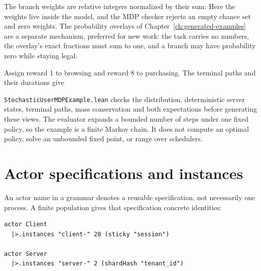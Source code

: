 The branch weights are relative integers normalized by their sum:
Here the weights live inside the model, and the MDP checker rejects an empty
chance set and zero weights. The probability overlays of
Chapter~\ref{ch:generated-examples} are a separate mechanism, preferred for new
work: the task carries no numbers, the overlay's exact fractions must sum to one,
and a branch may have probability zero while staying legal.

Assign reward 1 to browsing and reward 8 to purchasing. The terminal paths and
their durations give
\begin{center}
\end{center}

\texttt{StochasticUserMDPExample.lean} checks the distribution, deterministic
server states, terminal paths, mass conservation and both expectations before
generating these views. The evaluator expands a bounded number of steps under one
fixed policy, so the example is a finite Markov chain. It does not compute an
optimal policy, solve an unbounded fixed point, or range over schedulers.

\section{Actor specifications and instances}

An actor name in a grammar denotes a reusable specification, not necessarily one
process. A finite population gives that specification concrete identities:

\begin{lstlisting}
actor Client
  |>.instances "client-" 20 (sticky "session")

actor Server
  |>.instances "server-" 2 (shardHash "tenant_id")
\end{lstlisting}

